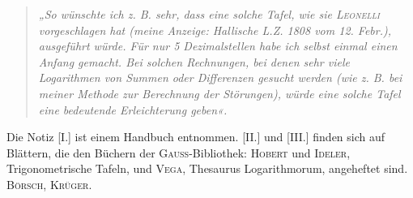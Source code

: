 \begin{quotation}\itshape
„So wünschte ich z. B. sehr, dass eine solche Tafel, wie sie \textup{\textsc{Leonelli}}
vorgeschlagen hat (meine Anzeige: Hallische L.Z. 1808 vom 12. Febr.), ausgeführt würde.
Für nur 5 Dezimalstellen habe ich selbst einmal einen Anfang gemacht. Bei solchen
Rechnungen, bei denen sehr viele Logarithmen von Summen oder Differenzen gesucht
werden (wie z. B. bei meiner Methode zur Berechnung der Störungen), würde eine
solche Tafel eine bedeutende Erleichterung geben«.
\end{quotation}

Die Notiz [I.] ist einem Handbuch entnommen. [II.] und [III.] finden sich auf Blättern,
die den Büchern der \textsc{Gauss}-Bibliothek: \textsc{Hobert} und \textsc{Ideler},
Trigonometrische Tafeln, und \textsc{Vega}, Thesaurus Logarithmorum, angeheftet sind.
\hfill \textsc{Börsch, Krüger}.

